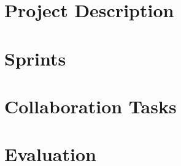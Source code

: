 \part*{Project Description}



\part{Sprints}




\part{Collaboration Tasks}


\part{Evaluation}



